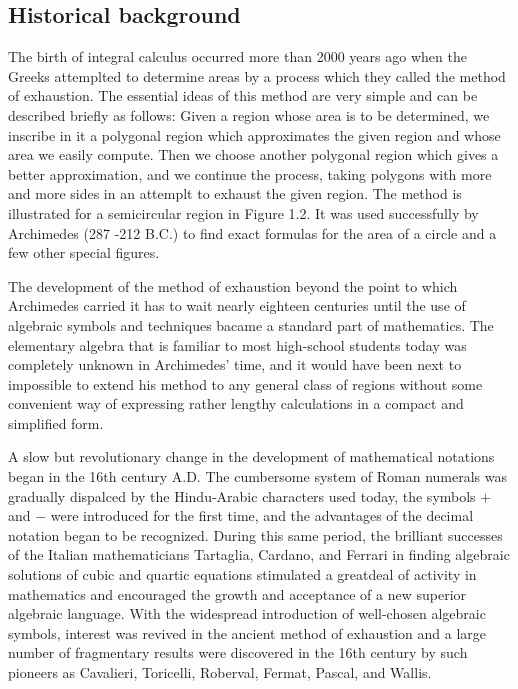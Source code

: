 \documentclass[cn,11pt,chinese]{elegantbook}
\numberwithin{equation}{section}
\begin{document}
\subsection{Historical background}\label{section0010102}
The birth of integral calculus occurred more than 2000 years ago when the Greeks attemplted to determine areas by a process which they called the method of exhaustion. The essential ideas of this method are very simple and can be described briefly as follows: Given a region whose area is to be determined, we inscribe in it a polygonal region which approximates the given region and whose area we easily compute. Then we choose another polygonal region which gives a better approximation, and we continue the process, taking polygons with more and more sides in an attemplt to exhaust the given region. The method is illustrated for a semicircular region in Figure 1.2. It was used successfully by Archimedes (287 -212 B.C.) to find exact formulas for the area of a circle and a few other special figures.

The development of the method of exhaustion beyond the point to which Archimedes carried it has to wait nearly eighteen centuries until the use of algebraic symbols and techniques bacame a standard part of mathematics. The elementary algebra that is familiar to most high-school students today was completely unknown in Archimedes' time, and it would have been next to impossible to extend his method to any general class of regions without some convenient way of expressing rather lengthy calculations in a compact and simplified form.

A slow but revolutionary change in the development of mathematical notations began in the 16th century A.D. The cumbersome system of Roman numerals was gradually dispalced by the Hindu-Arabic characters used today, the symbols $+$ and $-$ were introduced for the first time, and the advantages of the decimal notation began to be recognized. During this same period, the brilliant successes of the Italian mathematicians Tartaglia, Cardano, and Ferrari in finding algebraic solutions of cubic and quartic equations stimulated a greatdeal of activity in mathematics and encouraged the growth and acceptance of a new superior algebraic language. With the widespread introduction of well-chosen algebraic symbols, interest was revived in the ancient method of exhaustion and a large number of fragmentary results were discovered in the 16th century by such pioneers as Cavalieri, Toricelli, Roberval, Fermat, Pascal, and Wallis.
\end{document}
